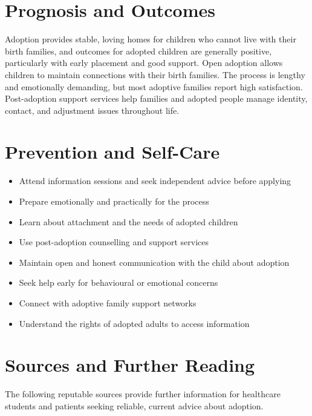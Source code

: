 \section*{Prognosis and Outcomes}
Adoption provides stable, loving homes for children who cannot live with their birth families, and outcomes for adopted children are generally positive, particularly with early placement and good support. Open adoption allows children to maintain connections with their birth families. The process is lengthy and emotionally demanding, but most adoptive families report high satisfaction. Post-adoption support services help families and adopted people manage identity, contact, and adjustment issues throughout life.

\section*{Prevention and Self-Care}
\begin{itemize}
    \item Attend information sessions and seek independent advice before applying
    \item Prepare emotionally and practically for the process
    \item Learn about attachment and the needs of adopted children
    \item Use post-adoption counselling and support services
    \item Maintain open and honest communication with the child about adoption
    \item Seek help early for behavioural or emotional concerns
    \item Connect with adoptive family support networks
    \item Understand the rights of adopted adults to access information
\end{itemize}

\section*{Sources and Further Reading}
The following reputable sources provide further information for healthcare students and patients seeking reliable, current advice about adoption.


